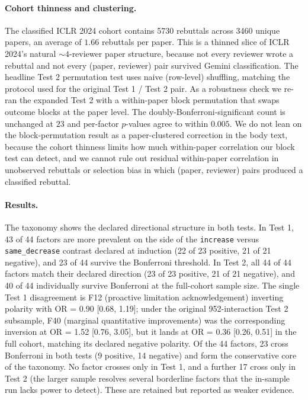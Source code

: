 \documentclass{article}
\newcommand{\code}[1]{\texttt{#1}}
\begin{document}
\paragraph{Cohort thinness and clustering.}
The classified ICLR 2024 cohort contains \num{5730} rebuttals across \num{3460} unique papers, an average of $1.66$ rebuttals per paper. This is a thinned slice of ICLR 2024's natural ${\sim}4$-reviewer paper structure, because not every reviewer wrote a rebuttal and not every (paper, reviewer) pair survived Gemini classification. The headline Test 2 permutation test uses naive (row-level) shuffling, matching the protocol used for the original Test 1 / Test 2 pair. As a robustness check we re-ran the expanded Test 2 with a within-paper block permutation that swaps outcome blocks at the paper level. The doubly-Bonferroni-significant count is unchanged at $23$ and per-factor $p$-values agree to within $0.005$. We do not lean on the block-permutation result as a paper-clustered correction in the body text, because the cohort thinness limits how much within-paper correlation our block test can detect, and we cannot rule out residual within-paper correlation in unobserved rebuttals or selection bias in which (paper, reviewer) pairs produced a classified rebuttal.

\paragraph{Results.}
The taxonomy shows the declared directional structure in both tests. In Test 1, 43 of 44 factors are more prevalent on the side of the \code{increase} versus \code{same\_decrease} contrast declared at induction (22 of 23 positive, 21 of 21 negative), and 23 of 44 survive the Bonferroni threshold. In Test 2, all 44 of 44 factors match their declared direction (23 of 23 positive, 21 of 21 negative), and 40 of 44 individually survive Bonferroni at the full-cohort sample size. The single Test 1 disagreement is F12 (proactive limitation acknowledgement) inverting polarity with OR = 0.90 [0.68, 1.19]; under the original \num{952}-interaction Test 2 subsample, F40 (marginal quantitative improvements) was the corresponding inversion at OR = 1.52 [0.76, 3.05], but it lands at OR = 0.36 [0.26, 0.51] in the full cohort, matching its declared negative polarity. Of the 44 factors, 23 cross Bonferroni in both tests (9 positive, 14 negative) and form the conservative core of the taxonomy. No factor crosses only in Test 1, and a further 17 cross only in Test 2 (the larger sample resolves several borderline factors that the in-sample run lacks power to detect). These are retained but reported as weaker evidence.
\end{document}
